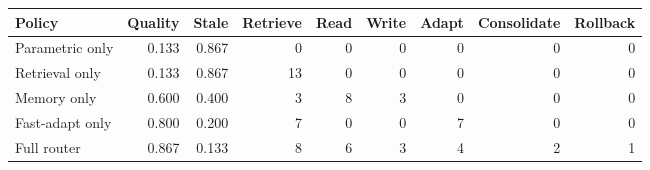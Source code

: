 \begin{tabular}{lrrrrrrrr}
\toprule
Policy & Quality & Stale & Retrieve & Read & Write & Adapt & Consolidate & Rollback \\
\midrule
Parametric only & 0.133 & 0.867 & 0 & 0 & 0 & 0 & 0 & 0 \\
Retrieval only & 0.133 & 0.867 & 13 & 0 & 0 & 0 & 0 & 0 \\
Memory only & 0.600 & 0.400 & 3 & 8 & 3 & 0 & 0 & 0 \\
Fast-adapt only & 0.800 & 0.200 & 7 & 0 & 0 & 7 & 0 & 0 \\
Full router & 0.867 & 0.133 & 8 & 6 & 3 & 4 & 2 & 1 \\
\bottomrule
\end{tabular}
